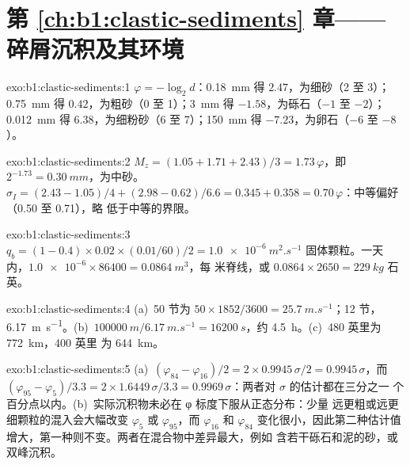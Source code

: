 \section*{第 \ref{ch:b1:clastic-sediments} 章——碎屑沉积及其环境}

\begin{solution}{exo:b1:clastic-sediments:1}
$\varphi = -\log_2 d$：\qty{0.18}{mm} 得 $2.47$，为细砂（2 至 3）；
\qty{0.75}{mm} 得 $0.42$，为粗砂（0 至 1）；\qty{3}{mm} 得
$-1.58$，为砾石（$-1$ 至 $-2$）；\qty{0.012}{mm} 得 $6.38$，为细粉砂（6
至 7）；\qty{150}{mm} 得 $-7.23$，为卵石（$-6$ 至 $-8$）。
\end{solution}

\begin{solution}{exo:b1:clastic-sediments:2}
$M_z = (1.05 + 1.71 + 2.43)/3 = 1.73\,\varphi$，即 $2^{-1.73} =
\qty{0.30}{mm}$，为中砂。$\sigma_I = (2.43 - 1.05)/4 + (2.98 - 0.62)/6.6
= 0.345 + 0.358 = 0.70\,\varphi$：中等偏好（0.50 至 0.71），略
低于中等的界限。
\end{solution}

\begin{solution}{exo:b1:clastic-sediments:3}
$q_b = (1 - 0.4) \times 0.02 \times (\num{0.01}/60)/2 = \qty{1.0e-6}{m^2.s^{-1}}$
固体颗粒。一天内，$\num{1.0e-6} \times 86400 = \qty{0.0864}{m^3}$，每
米脊线，或 $0.0864 \times 2650 = \qty{229}{kg}$ 石英。
\end{solution}

\begin{solution}{exo:b1:clastic-sediments:4}
(a)~50 节为 $50 \times 1852/3600 = \qty{25.7}{m.s^{-1}}$；12 节，
\qty{6.17}{m.s^{-1}}。(b)~$\qty{100000}{m}/\qty{6.17}{m.s^{-1}} =
\qty{16200}{s}$，约 \qty{4.5}{h}。(c)~480 英里为 \qty{772}{km}，400 英里
为 \qty{644}{km}。
\end{solution}

\begin{solution}{exo:b1:clastic-sediments:5}
(a)~$(\varphi_{84} - \varphi_{16})/2 = 2 \times 0.9945\,\sigma/2 =
0.9945\,\sigma$，而 $(\varphi_{95} - \varphi_5)/3.3 = 2 \times
1.6449\,\sigma/3.3 = 0.9969\,\sigma$：两者对 $\sigma$ 的估计都在三分之一
个百分点以内。(b)~实际沉积物未必在 φ 标度下服从正态分布：少量
远更粗或远更细颗粒的混入会大幅改变 $\varphi_5$ 或
$\varphi_{95}$，而 $\varphi_{16}$ 和 $\varphi_{84}$ 变化很小，因此第二种估计值
增大，第一种则不变。两者在混合物中差异最大，例如
含若干砾石和泥的砂，或双峰沉积。
\end{solution}

